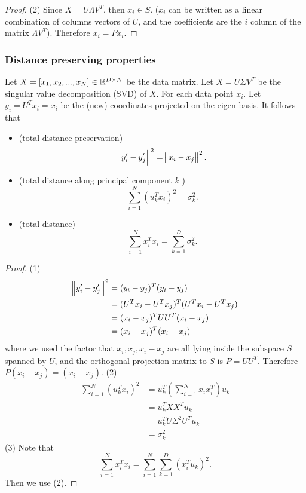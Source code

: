 \begin{refsection}
\begin{proof}
(2) Since $X = U\Lambda V^T$, then $x_i \in S$. ($x_i$ can be written as a linear combination of columns vectors of $U$, and the coefficients are the $i$ column of the matrix $\Lambda V^T$). Therefore $x_i = Px_i$. 	
\end{proof}


\subsubsection{Distance preserving properties}


\begin{theorem}
	Let $X = [x_1,x_2,...,x_N] \in \mathbb{R}^{D\times N}$ be the data matrix. Let $X = U\Sigma V^T$ be the singular value decomposition (SVD) of $X$. For each data point $x_i$. Let $y_i = U^Tx_i = x_i$ be the (new) coordinates projected on the eigen-basis. 
It follows that
\begin{itemize}
	\item (total distance preservation)
	$$\norm{y_i' - y_j'}^2 = \norm{x_i - x_j}^2.$$
	\item (total distance along principal component $k$ )  
	$$ \sum_{i=1}^N (u_k^Tx_i)^2 = \sigma_k^2.$$
	\item (total distance)  
	$$ \sum_{i=1}^N x_i^Tx_i = \sum_{k=1}^D \sigma_k^2.$$
\end{itemize}
\end{theorem}
\begin{proof}
(1)
\begin{align*}
\norm{y_i' - y_j'}^2 &= (y_i - y_j)^T(y_i-y_j) \\
					 &= (U^Tx_i-U^Tx_j)^T(U^Tx_i-U^Tx_j)\\
					 &= (x_i-x_j)^TUU^T(x_i-x_j)\\
					 &= (x_i-x_j)^T(x_i-x_j)
\end{align*}	
where we used the factor that $x_i, x_j, x_i-x_j$ are all lying inside the subspace $S$ spanned by $U$, and the orthogonal projection matrix to $S$ is $P=UU^T$. Therefore $P(x_i-x_j) = (x_i-x_j)$. 
(2)
\begin{align*}
\sum_{i=1}^N (u_k^Tx_i)^2 &= u_k^T(\sum_{i=1}^N x_ix_i^T) u_k \\
                          &= u_k^T XX^T u_k \\
                          &= u_k^T U\Sigma^2 U^T u_k \\
                          &= \sigma_k^2 
\end{align*}
(3) Note that $$ \sum_{i=1}^N x_i^Tx_i = \sum_{i=1}^N \sum_{k=1}^D (x_i^Tu_k)^2.$$
Then we use (2).
\end{proof}


\end{refsection}
